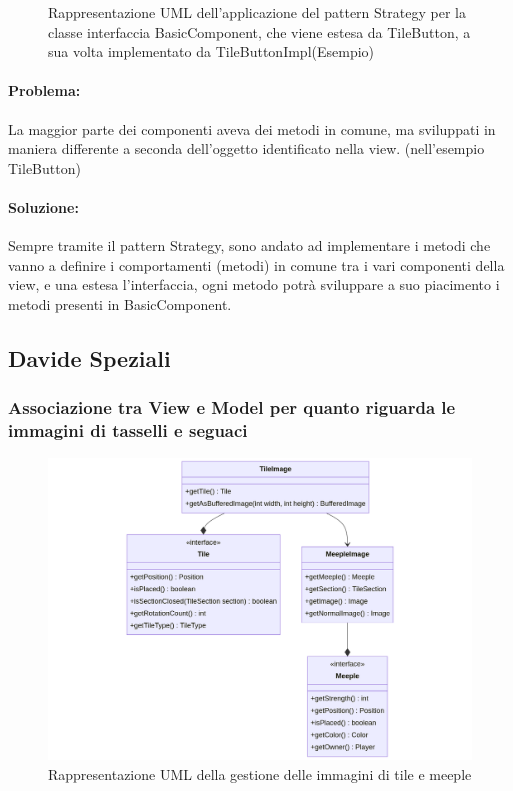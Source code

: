 \begin{figure}[ht]
    \caption{Rappresentazione UML dell'applicazione del pattern Strategy per la classe interfaccia BasicComponent, che viene estesa da TileButton, a sua volta implementato da TileButtonImpl(Esempio)}
\end{figure}

\paragraph{Problema:}
La maggior parte dei componenti aveva dei metodi in comune, ma sviluppati in maniera differente a seconda dell'oggetto identificato nella view. (nell'esempio TileButton)
\paragraph{Soluzione:}
Sempre tramite il pattern Strategy, sono andato ad implementare i metodi che vanno a definire i comportamenti (metodi) in comune tra i vari componenti della view, e una estesa l'interfaccia, ogni metodo potrà sviluppare a suo piacimento i metodi presenti in BasicComponent.

\subsection*{Davide Speziali}


\subsubsection*{Associazione tra View e Model per quanto riguarda le immagini di tasselli e seguaci}
\begin{figure}[h]
    \centering\includegraphics[scale=.4]{images/uml_tilemeeple_images.png}
    \caption{Rappresentazione UML della gestione delle immagini di tile e meeple}
\end{figure}
